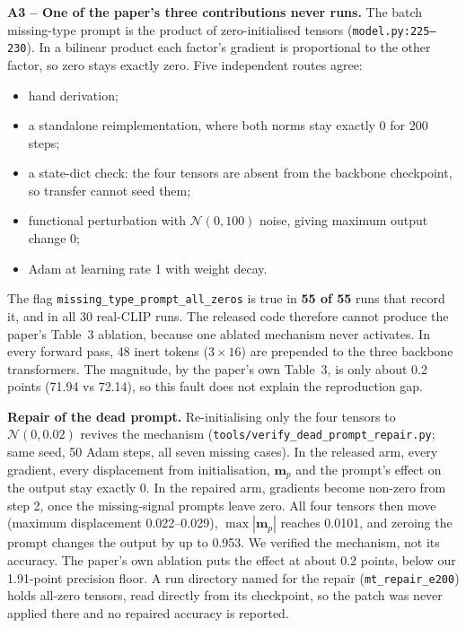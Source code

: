 \documentclass[lettersize,journal]{IEEEtran}
\begin{document}
\textbf{A3 -- One of the paper's three contributions never runs.} The batch missing-type prompt is the product of zero-initialised tensors (\texttt{model.py:225--230}). In a bilinear product each factor's gradient is proportional to the other factor, so zero stays exactly zero. Five independent routes agree:
\begin{itemize}
\item hand derivation;
\item a standalone reimplementation, where both norms stay exactly $0$ for 200 steps;
\item a state-dict check: the four tensors are absent from the backbone checkpoint, so transfer cannot seed them;
\item functional perturbation with $\mathcal{N}(0,100)$ noise, giving maximum output change $0$;
\item Adam at learning rate 1 with weight decay.
\end{itemize}
The flag \texttt{missing\_type\_prompt\_all\_zeros} is true in \textbf{55 of 55} runs that record it, and in all 30 real-CLIP runs. The released code therefore cannot produce the paper's Table~3 ablation, because one ablated mechanism never activates. In every forward pass, 48 inert tokens ($3\times16$) are prepended to the three backbone transformers. The magnitude, by the paper's own Table~3, is only about 0.2 points (71.94 vs 72.14), so this fault does not explain the reproduction gap.

\textbf{Repair of the dead prompt.} Re-initialising only the four tensors to $\mathcal{N}(0,0.02)$ revives the mechanism (\texttt{tools/verify\_dead\_prompt\_repair.py}; same seed, 50 Adam steps, all seven missing cases). In the released arm, every gradient, every displacement from initialisation, $\mathbf{m}_p$ and the prompt's effect on the output stay exactly 0. In the repaired arm, gradients become non-zero from step 2, once the missing-signal prompts leave zero. All four tensors then move (maximum displacement 0.022--0.029), $\max|\mathbf{m}_p|$ reaches 0.0101, and zeroing the prompt changes the output by up to 0.953. We verified the mechanism, not its accuracy. The paper's own ablation puts the effect at about 0.2 points, below our 1.91-point precision floor. A run directory named for the repair (\texttt{mt\_repair\_e200}) holds all-zero tensors, read directly from its checkpoint, so the patch was never applied there and no repaired accuracy is reported.
\end{document}
